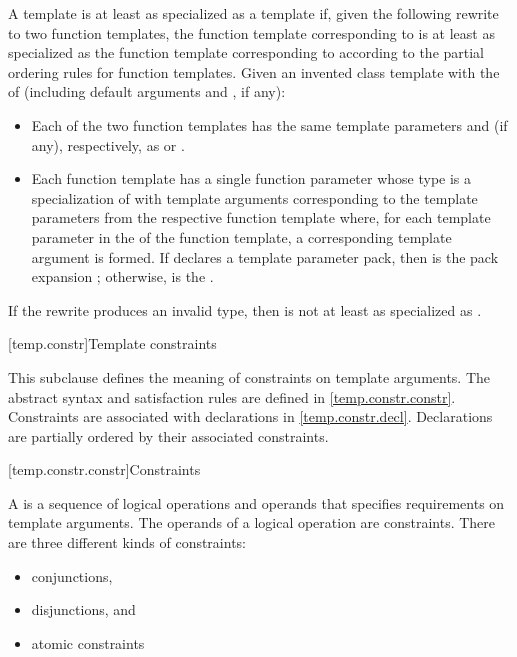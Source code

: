 \pnum
A template   is
at least as specialized as a template  
if, given the following rewrite to two function templates,
the function template corresponding to 
is at least as specialized as
the function template corresponding to 
according to the partial ordering rules
for function templates.
Given an invented class template 
with the  of  (including default arguments
and , if any):

\begin{itemize}
\item
Each of the two function templates has the same template parameters
and  (if any),
respectively, as  or .
\item
Each function template has a single function parameter
whose type is a specialization of 
with template arguments corresponding to the template parameters
from the respective function template where,
for each template parameter 
in the  of the function template,
a corresponding template argument  is formed.
If  declares a template parameter pack,
then  is the pack expansion ;
otherwise,  is the  .
\end{itemize}
If the rewrite produces an invalid type,
then  is not at least as specialized as .

[temp.constr]{Template constraints}

\pnum
\begin{note}
This subclause defines the meaning of constraints on template arguments.
The abstract syntax and satisfaction rules are defined
in \ref{temp.constr.constr}.
Constraints are associated with declarations in \ref{temp.constr.decl}.
Declarations are partially ordered by their associated constraints.
\end{note}

[temp.constr.constr]{Constraints}

\pnum
A  is a sequence of logical operations and
operands that specifies requirements on template arguments.
The operands of a logical operation are constraints.
There are three different kinds of constraints:
\begin{itemize}
\item conjunctions,
\item disjunctions, and
\item atomic constraints
\end{itemize}

